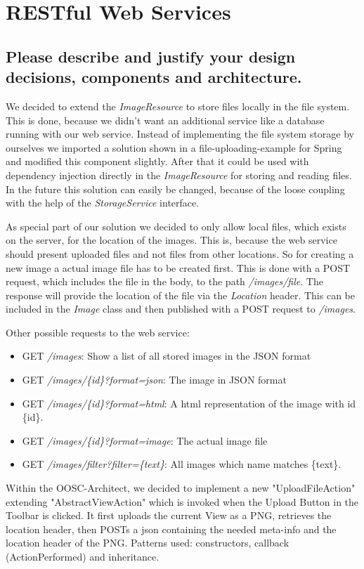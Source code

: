 
\section{RESTful Web Services}
\subsection{Please describe and justify your design decisions, components and
architecture.}

We decided to extend the \textit{ImageResource} to store files locally in the file system. This is done, because we didn't want an additional service like a database running with our web service. Instead of implementing the file system storage by ourselves we imported a solution shown in a file-uploading-example for Spring and modified this component slightly. After that it could be used with dependency injection directly in the \textit{ImageResource} for storing and reading files. In the future this solution can easily be changed, because of the loose coupling with the help of the \textit{StorageService} interface.

As special part of our solution we decided to only allow local files, which exists on the server, for the location of the images. This is, because the web service should present uploaded files and not files from other locations. So for creating a new image a actual image file has to be created first. This is done with a POST request, which includes the file in the body, to the path \textit{/images/file}. The response will provide the location of the file via the \textit{Location} header. This can be included in the \textit{Image} class and then published with a POST request to \textit{/images}.

Other possible requests to the web service:
\begin{itemize}
    \item GET \textit{/images}: Show a list of all stored images in the JSON format
    \item GET \textit{/images/\{id\}?format=json}: The image in JSON format
    \item GET \textit{/images/\{id\}?format=html}: A html representation of the image with id \{id\}.
    \item GET \textit{/images/\{id\}?format=image}: The actual image file
    \item GET \textit{/images/filter?filter=\{text\}}: All images which name matches \{text\}.
\end{itemize}

Within the OOSC-Architect, we decided to implement a new "UploadFileAction" extending "AbstractViewAction" which is invoked when the Upload Button in the Toolbar is clicked.
It first uploads the current View as a PNG, retrieves the location header, then POSTs a json containing the needed meta-info and the location header of the PNG.
Patterns used: constructors, callback (ActionPerformed) and inheritance.
